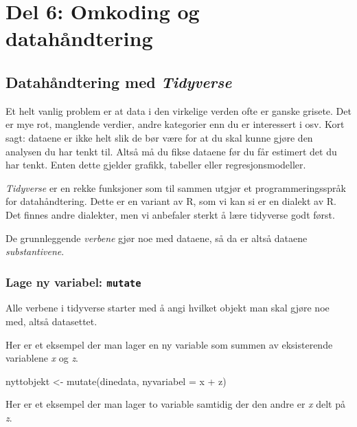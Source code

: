 \documentclass[
  letterpaper,
  DIV=11,
  numbers=noendperiod]{scrreprt}
\newenvironment{Shaded}{\begin{snugshade}}{\end{snugshade}}
\newcommand{\AttributeTok}[1]{\textcolor[rgb]{0.40,0.45,0.13}{#1}}
\newcommand{\FunctionTok}[1]{\textcolor[rgb]{0.28,0.35,0.67}{#1}}
\newcommand{\NormalTok}[1]{\textcolor[rgb]{0.00,0.23,0.31}{#1}}
\newcommand{\OtherTok}[1]{\textcolor[rgb]{0.00,0.23,0.31}{#1}}
\newcommand{\SpecialCharTok}[1]{\textcolor[rgb]{0.37,0.37,0.37}{#1}}
\theoremstyle{definition}
\theoremstyle{remark}
\begin{document}
\part{Del 6: Omkoding og datahåndtering}

\hypertarget{datahuxe5ndtering-med-tidyverse}{%
\chapter{\texorpdfstring{Datahåndtering med
\emph{Tidyverse}}{Datahåndtering med Tidyverse}}\label{datahuxe5ndtering-med-tidyverse}}

Et helt vanlig problem er at data i den virkelige verden ofte er ganske
grisete. Det er mye rot, manglende verdier, andre kategorier enn du er
interessert i osv. Kort sagt: dataene er ikke helt slik de bør være for
at du skal kunne gjøre den analysen du har tenkt til. Altså må du fikse
dataene før du får estimert det du har tenkt. Enten dette gjelder
grafikk, tabeller eller regresjonsmodeller.

\emph{Tidyverse} er en rekke funksjoner som til sammen utgjør et
programmeringsspråk for datahåndtering. Dette er en variant av R, som vi
kan si er en dialekt av R. Det finnes andre dialekter, men vi anbefaler
sterkt å lære tidyverse godt først.

De grunnleggende \emph{verbene} gjør noe med dataene, så da er altså
dataene \emph{substantivene}.

\hypertarget{lage-ny-variabel-mutate}{%
\section{\texorpdfstring{Lage ny variabel:
\texttt{mutate}}{Lage ny variabel: mutate}}\label{lage-ny-variabel-mutate}}

Alle verbene i tidyverse starter med å angi hvilket objekt man skal
gjøre noe med, altså datasettet.

Her er et eksempel der man lager en ny variable som summen av
eksisterende variablene \emph{x} og \emph{z}.

\begin{Shaded}
\begin{Highlighting}[]
\NormalTok{nyttobjekt }\OtherTok{\textless{}{-}} \FunctionTok{mutate}\NormalTok{(dinedata, }\AttributeTok{nyvariabel =}\NormalTok{ x }\SpecialCharTok{+}\NormalTok{ z)}
\end{Highlighting}
\end{Shaded}

Her er et eksempel der man lager to variable samtidig der den andre er
\emph{x} delt på \emph{z}.
\end{document}
